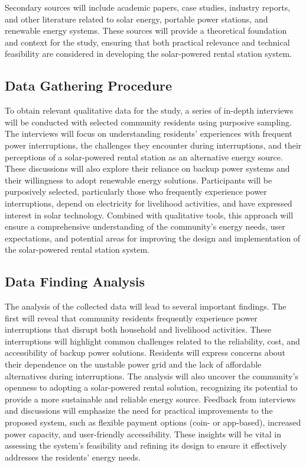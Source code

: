 {Secondary sources will include academic papers, case studies, industry reports, and other literature related to solar energy, portable power stations, and renewable energy systems. These sources will provide a theoretical foundation and context for the study, ensuring that both practical relevance and technical feasibility are considered in developing the solar-powered rental station system.

\subsection{Data Gathering Procedure}

To obtain relevant qualitative data for the study, a series of in-depth interviews will be conducted with selected community residents using purposive sampling. The interviews will focus on understanding residents’ experiences with frequent power interruptions, the challenges they encounter during interruptions, and their perceptions of a solar-powered rental station as an alternative energy source. These discussions will also explore their reliance on backup power systems and their willingness to adopt renewable energy solutions. Participants will be purposively selected, particularly those who frequently experience power interruptions, depend on electricity for livelihood activities, and have expressed interest in solar technology. Combined with qualitative tools, this approach will ensure a comprehensive understanding of the community’s energy needs, user expectations, and potential areas for improving the design and implementation of the solar-powered rental station system.

\subsection{Data Finding Analysis}

The analysis of the collected data will lead to several important findings. The first will reveal that community residents frequently experience power interruptions that disrupt both household and livelihood activities. These interruptions will highlight common challenges related to the reliability, cost, and accessibility of backup power solutions. Residents will express concerns about their dependence on the unstable power grid and the lack of affordable alternatives during interruptions. The analysis will also uncover the community’s openness to adopting a solar-powered rental solution, recognizing its potential to provide a more sustainable and reliable energy source. Feedback from interviews and discussions will emphasize the need for practical improvements to the proposed system, such as flexible payment options (coin- or app-based), increased power capacity, and user-friendly accessibility. These insights will be vital in assessing the system’s feasibility and refining its design to ensure it effectively addresses the residents’ energy needs.

}
